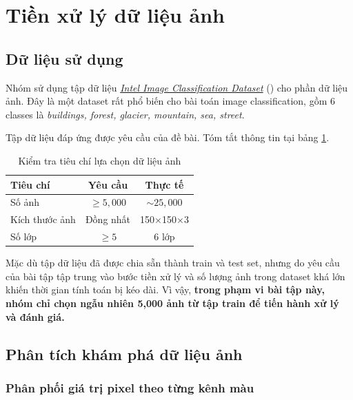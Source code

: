 \section{Tiền xử lý dữ liệu ảnh}

\subsection{Dữ liệu sử dụng}

Nhóm sử dụng tập dữ liệu \href{https://huggingface.co/datasets/sfarrukhm/intel-image-classification}{\textit{Intel Image Classification Dataset}} (\cite{intel_image_dataset}) cho phần dữ liệu ảnh. Đây là một dataset rất phổ biến cho bài toán image classification, gồm 6 classes là \textit{buildings, forest, glacier, mountain, sea, street}.

Tập dữ liệu đáp ứng được yêu cầu của đề bài. Tóm tắt thông tin tại bảng \ref{tab:image_data_criteria}.

\begin{table}[H]
    \centering
    \begin{tabular}{|l|c|c|}
        \hline
        \textbf{Tiêu chí} & \textbf{Yêu cầu} & \textbf{Thực tế}            \\
        \hline
        Số ảnh            & $\geq 5{,}000$   & $\sim 25{,}000$             \\
        \hline
        Kích thước ảnh    & Đồng nhất        & 150\(\times\)150\(\times\)3 \\
        \hline
        Số lớp            & $\geq 5$         & 6 lớp                       \\
        \hline
    \end{tabular}
    \caption{Kiểm tra tiêu chí lựa chọn dữ liệu ảnh}
    \label{tab:image_data_criteria}
\end{table}

Mặc dù tập dữ liệu đã được chia sẵn thành train và test set, nhưng do yêu cầu của bài tập tập trung vào bước tiền xử lý và số lượng ảnh trong dataset khá lớn khiến thời gian tính toán bị kéo dài. Vì vậy, \textbf{trong phạm vi bài tập này, nhóm chỉ chọn ngẫu nhiên 5,000 ảnh từ tập train để tiến hành xử lý và đánh giá.}

\subsection{Phân tích khám phá dữ liệu ảnh}

\subsubsection{Phân phối giá trị pixel theo từng kênh màu}

